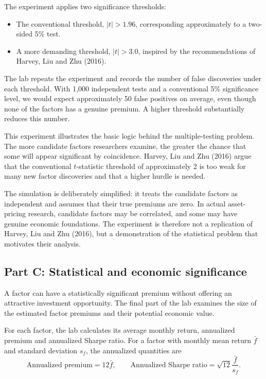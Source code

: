 The experiment applies two significance thresholds:
\begin{itemize}
  \item The conventional threshold, $|t|>1.96$, corresponding approximately to a two-sided 5\% test.
  \item A more demanding threshold, $|t|>3.0$, inspired by the recommendations of Harvey, Liu and Zhu (2016).
\end{itemize}

The lab repeats the experiment and records the number of false discoveries under each threshold. With 1,000 independent tests and a conventional 5\% significance level, we would expect approximately 50 false positives on average, even though none of the factors has a genuine premium. A higher threshold substantially reduces this number.

This experiment illustrates the basic logic behind the multiple-testing problem. The more candidate factors researchers examine, the greater the chance that some will appear significant by coincidence. Harvey, Liu and Zhu (2016) argue that the conventional $t$-statistic threshold of approximately 2 is too weak for many new factor discoveries and that a higher hurdle is needed.

The simulation is deliberately simplified: it treats the candidate factors as independent and assumes that their true premiums are zero. In actual asset-pricing research, candidate factors may be correlated, and some may have genuine economic foundations. The experiment is therefore not a replication of Harvey, Liu and Zhu (2016), but a demonstration of the statistical problem that motivates their analysis.

\subsection*{Part C: Statistical and economic significance}

A factor can have a statistically significant premium without offering an attractive investment opportunity. The final part of the lab examines the size of the estimated factor premiums and their potential economic value.

For each factor, the lab calculates its average monthly return, annualized premium and annualized Sharpe ratio. For a factor with monthly mean return $\bar{f}$ and standard deviation $s_f$, the annualized quantities are
\begin{equation}
  \text{Annualized premium}=12\bar{f},
  \qquad
  \text{Annualized Sharpe ratio}
  =\sqrt{12}\frac{\bar{f}}{s_f}.
  \label{eq:03-lab-sharpe}
\end{equation}

